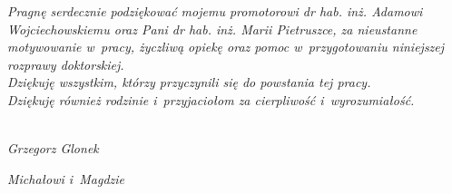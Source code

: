 \cleardoublepage
{}
{}
\vspace*{\fill}



\textit{Pragnę serdecznie podziękować mojemu promotorowi dr hab. inż. Adamowi Wojciechowskiemu oraz Pani dr hab. inż. Marii Pietruszce, za nieustanne motywowanie w~pracy, życzliwą opiekę oraz pomoc w~przygotowaniu niniejszej rozprawy doktorskiej.}\\
\textit{Dziękuję wszystkim, którzy przyczynili się do powstania tej pracy.}\\
\textit{Dziękuję również rodzinie i~przyjaciołom za cierpliwość i~wyrozumiałość.}\\\\
\begin{flushright}
\textit{Grzegorz Glonek}
\end{flushright}
\vspace*{\fill}

\cleardoublepage
{}
{}
\vspace*{\fill}
\begin{flushright}
\textit{Michałowi i~Magdzie}
\end{flushright}
\vspace*{\fill}